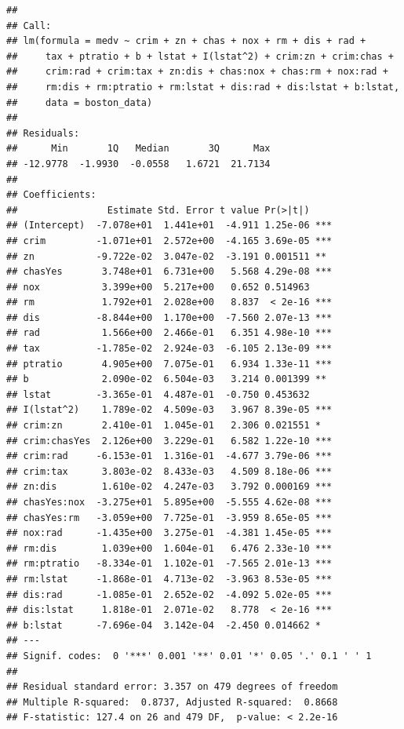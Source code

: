 \documentclass[
]{article}
\begin{document}
\begin{verbatim}
## 
## Call:
## lm(formula = medv ~ crim + zn + chas + nox + rm + dis + rad + 
##     tax + ptratio + b + lstat + I(lstat^2) + crim:zn + crim:chas + 
##     crim:rad + crim:tax + zn:dis + chas:nox + chas:rm + nox:rad + 
##     rm:dis + rm:ptratio + rm:lstat + dis:rad + dis:lstat + b:lstat, 
##     data = boston_data)
## 
## Residuals:
##      Min       1Q   Median       3Q      Max 
## -12.9778  -1.9930  -0.0558   1.6721  21.7134 
## 
## Coefficients:
##                Estimate Std. Error t value Pr(>|t|)    
## (Intercept)  -7.078e+01  1.441e+01  -4.911 1.25e-06 ***
## crim         -1.071e+01  2.572e+00  -4.165 3.69e-05 ***
## zn           -9.722e-02  3.047e-02  -3.191 0.001511 ** 
## chasYes       3.748e+01  6.731e+00   5.568 4.29e-08 ***
## nox           3.399e+00  5.217e+00   0.652 0.514963    
## rm            1.792e+01  2.028e+00   8.837  < 2e-16 ***
## dis          -8.844e+00  1.170e+00  -7.560 2.07e-13 ***
## rad           1.566e+00  2.466e-01   6.351 4.98e-10 ***
## tax          -1.785e-02  2.924e-03  -6.105 2.13e-09 ***
## ptratio       4.905e+00  7.075e-01   6.934 1.33e-11 ***
## b             2.090e-02  6.504e-03   3.214 0.001399 ** 
## lstat        -3.365e-01  4.487e-01  -0.750 0.453632    
## I(lstat^2)    1.789e-02  4.509e-03   3.967 8.39e-05 ***
## crim:zn       2.410e-01  1.045e-01   2.306 0.021551 *  
## crim:chasYes  2.126e+00  3.229e-01   6.582 1.22e-10 ***
## crim:rad     -6.153e-01  1.316e-01  -4.677 3.79e-06 ***
## crim:tax      3.803e-02  8.433e-03   4.509 8.18e-06 ***
## zn:dis        1.610e-02  4.247e-03   3.792 0.000169 ***
## chasYes:nox  -3.275e+01  5.895e+00  -5.555 4.62e-08 ***
## chasYes:rm   -3.059e+00  7.725e-01  -3.959 8.65e-05 ***
## nox:rad      -1.435e+00  3.275e-01  -4.381 1.45e-05 ***
## rm:dis        1.039e+00  1.604e-01   6.476 2.33e-10 ***
## rm:ptratio   -8.334e-01  1.102e-01  -7.565 2.01e-13 ***
## rm:lstat     -1.868e-01  4.713e-02  -3.963 8.53e-05 ***
## dis:rad      -1.085e-01  2.652e-02  -4.092 5.02e-05 ***
## dis:lstat     1.818e-01  2.071e-02   8.778  < 2e-16 ***
## b:lstat      -7.696e-04  3.142e-04  -2.450 0.014662 *  
## ---
## Signif. codes:  0 '***' 0.001 '**' 0.01 '*' 0.05 '.' 0.1 ' ' 1
## 
## Residual standard error: 3.357 on 479 degrees of freedom
## Multiple R-squared:  0.8737, Adjusted R-squared:  0.8668 
## F-statistic: 127.4 on 26 and 479 DF,  p-value: < 2.2e-16
\end{verbatim}
\end{document}
